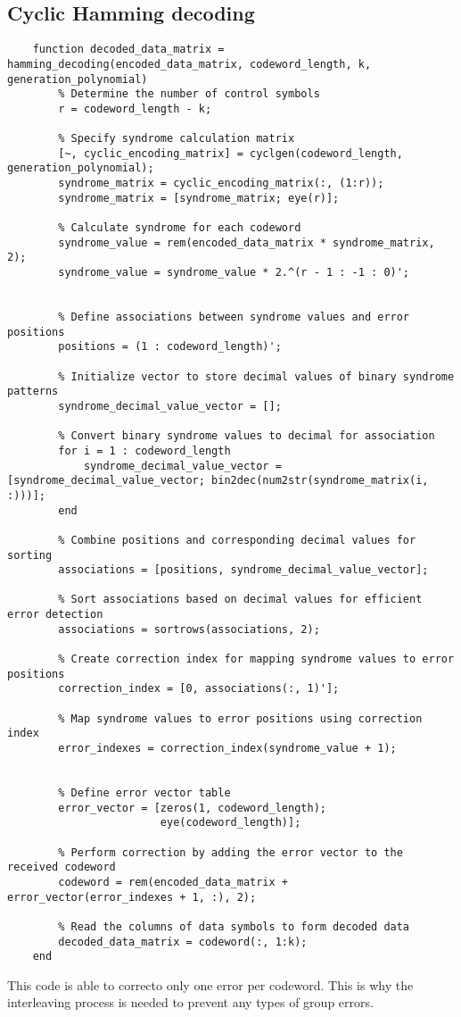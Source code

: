\subsection{Cyclic Hamming decoding}


\begin{lstlisting}
    function decoded_data_matrix = hamming_decoding(encoded_data_matrix, codeword_length, k, generation_polynomial)
        % Determine the number of control symbols
        r = codeword_length - k;
        
        % Specify syndrome calculation matrix
        [~, cyclic_encoding_matrix] = cyclgen(codeword_length, generation_polynomial);
        syndrome_matrix = cyclic_encoding_matrix(:, (1:r));
        syndrome_matrix = [syndrome_matrix; eye(r)];
        
        % Calculate syndrome for each codeword
        syndrome_value = rem(encoded_data_matrix * syndrome_matrix, 2);
        syndrome_value = syndrome_value * 2.^(r - 1 : -1 : 0)';
        
    
        % Define associations between syndrome values and error positions
        positions = (1 : codeword_length)'; 
    
        % Initialize vector to store decimal values of binary syndrome patterns
        syndrome_decimal_value_vector = [];
    
        % Convert binary syndrome values to decimal for association
        for i = 1 : codeword_length
            syndrome_decimal_value_vector = [syndrome_decimal_value_vector; bin2dec(num2str(syndrome_matrix(i, :)))];
        end
    
        % Combine positions and corresponding decimal values for sorting
        associations = [positions, syndrome_decimal_value_vector];
    
        % Sort associations based on decimal values for efficient error detection
        associations = sortrows(associations, 2);
    
        % Create correction index for mapping syndrome values to error positions
        correction_index = [0, associations(:, 1)'];
    
        % Map syndrome values to error positions using correction index
        error_indexes = correction_index(syndrome_value + 1);
        
    
        % Define error vector table
        error_vector = [zeros(1, codeword_length);
                        eye(codeword_length)];
        
        % Perform correction by adding the error vector to the received codeword
        codeword = rem(encoded_data_matrix + error_vector(error_indexes + 1, :), 2);
        
        % Read the columns of data symbols to form decoded data
        decoded_data_matrix = codeword(:, 1:k);
    end
\end{lstlisting}

This code is able to correcto only one error per codeword. This is why the interleaving process is needed to prevent any types of group errors.
